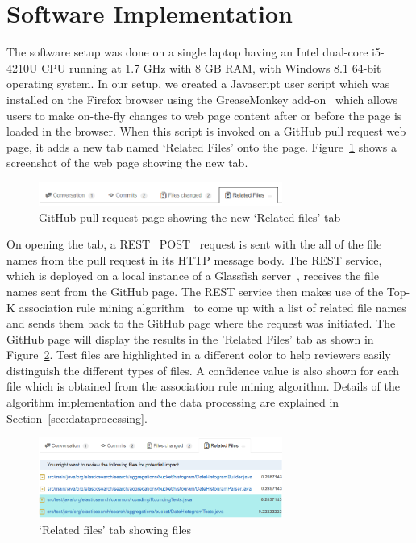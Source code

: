 
\section{Software Implementation}
\label{sec:setup}

The software setup was done on a single laptop having an Intel dual-core i5-4210U CPU running at 1.7 GHz with 8 GB RAM, with Windows 8.1 64-bit operating system. In our setup, we created a Javascript user script which was installed on the Firefox browser using the GreaseMonkey add-on~\cite{greasemonkey1,greasemonkey2} which allows users to make on-the-fly changes to web page content after or before the page is loaded in the browser. When this script is invoked on a GitHub pull request web page, it adds a new tab named `Related Files' onto the page. Figure~\ref{fig:newTabRelated} shows a screenshot of the web page showing the new tab.

\begin{figure}[ht!]
\centering
\includegraphics[width=8cm]{NewTabRelatedFiles}
\caption{GitHub pull request page showing the new `Related files' tab}
\label{fig:newTabRelated}
\end{figure}

On opening the tab, a REST~\cite{rest} POST~\cite{post_http} request is sent with the all of the file names from the pull request in its HTTP message body. The REST service, which is deployed on a local instance of a Glassfish server~\cite{glassfish}, receives the file names sent from the GitHub page. The REST service then makes use of the Top-K association rule mining algorithm~\cite{fournier2012mining} to come up with a list of related file names and sends them back to the GitHub page where the request was initiated. The GitHub page will display the results in the 'Related Files' tab as shown in Figure~\ref{fig:relatedFilesContents}. Test files are highlighted in a different color to help reviewers easily distinguish the different types of files. A confidence value is also shown for each file which is obtained from the association rule mining algorithm. Details of the algorithm implementation and the data processing are explained in Section~\ref{sec:dataprocessing}.

\begin{figure}[ht!]
\centering
\includegraphics[width=8cm]{RelatedFilesContents}
\caption{`Related files' tab showing files}
\label{fig:relatedFilesContents}
\end{figure}



